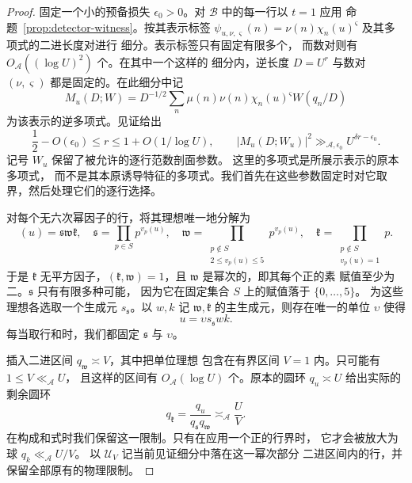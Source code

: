 \documentclass[11pt,a4paper]{article}
\numberwithin{equation}{section}
\numberwithin{figure}{section}
\theoremstyle{definition}
\theoremstyle{remark}
\begin{document}
\begin{proof}
固定一个小的预备损失 $\epsilon_0>0$。对 $\mathcal B$ 中的每一行以 $t=1$ 应用
命题~\ref{prop:detector-witness}。按其表示标签
$\psi_{u,\nu,\varsigma}(n)=\nu(n)\chi_n(u)^{\varsigma}$ 及其多项式的二进长度对进行
细分。表示标签只有固定有限多个，
而数对则有 $O_{\mathcal A}((\log U)^2)$ 个。在其中一个这样的
细分内，逆长度 $D=U^r$ 与数对 $(\nu,\varsigma)$
都是固定的。在此细分中记
\[
 M_u(D;W)=D^{-1/2}\sum_n\mu(n)\nu(n)\chi_n(u)^{\varsigma}W(q_n/D)
\]
为该表示的逆多项式。见证给出
\begin{equation}\label{eq:sextic-witness-spike}
 \frac12-O(\epsilon_0)\le r\le1+O(1/\log U),
 \qquad |M_u(D;W_u)|^2\gg_{\mathcal A,\epsilon_0}
       U^{\delta r-\epsilon_0}.
\end{equation}
记号 $W_u$ 保留了被允许的逐行范数剖面参数。
这里的多项式是所展示表示的原本多项式，
而不是其本原诱导特征的多项式。我们首先在这些参数固定时对它取
界，然后处理它们的逐行选择。

对每个无六次幂因子的行，将其理想唯一地分解为
\[
 (u)=\mathfrak s\mathfrak w\mathfrak k,
 \quad
 \mathfrak s=\prod_{p\in S}p^{v_p(u)},\quad
 \mathfrak w=\prod_{\substack{p\notin S\\2\le v_p(u)\le5}}p^{v_p(u)},
 \quad
 \mathfrak k=\prod_{\substack{p\notin S\\v_p(u)=1}}p.
\]
于是 $\mathfrak k$ 无平方因子，$(\mathfrak k,\mathfrak w)=1$，且
$\mathfrak w$ 是幂次的，即其每个正的素
赋值至少为二。$\mathfrak s$ 只有有限多种可能，
因为它在固定集合 $S$ 上的赋值落于 $\{0,\ldots,5\}$。
为这些理想各选取一个生成元 $s_{\mathfrak s}$。以 $w,k$ 记
$\mathfrak w,\mathfrak k$ 的主生成元，则存在唯一的单位 $\upsilon$ 使得
\[
 u=\upsilon s_{\mathfrak s}wk.
\]
每当取行和时，我们都固定 $\mathfrak s$ 与 $\upsilon$。

插入二进区间 $q_{\mathfrak w}\asymp V$，其中把单位理想
包含在有界区间 $V=1$ 内。只可能有 $1\le V\ll_{\mathcal A}U$，
且这样的区间有 $O_{\mathcal A}(\log U)$ 个。原本的圆环
$q_u\asymp U$ 给出实际的剩余圆环
\begin{equation}\label{eq:sextic-actual-row-annulus}
 q_{\mathfrak k}=\frac{q_u}{q_{\mathfrak s}q_{\mathfrak w}}
       \asymp_{\mathcal A}\frac UV.
\end{equation}
在构成和式时我们保留这一限制。只有在应用一个正的行界时，
它才会被放大为球 $q_k\ll_{\mathcal A}U/V$。
以 $\mathcal U_V$ 记当前见证细分中落在这一幂次部分
二进区间内的行，并保留全部原有的物理限制。


\end{proof}
\end{document}
